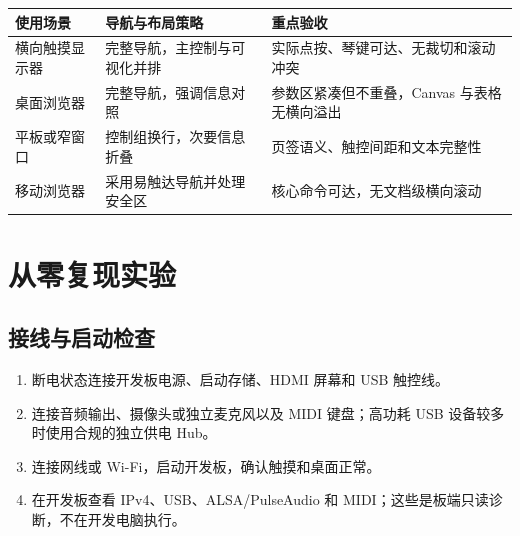 \begin{longtable}[]{@{}
  >{\raggedright\arraybackslash}p{}
  >{\raggedright\arraybackslash}p{}
  >{\raggedright\arraybackslash}p{}@{}}
\toprule\noalign{}
\begin{minipage}[b]{\linewidth}\raggedright
使用场景
\end{minipage} & \begin{minipage}[b]{\linewidth}\raggedright
导航与布局策略
\end{minipage} & \begin{minipage}[b]{\linewidth}\raggedright
重点验收
\end{minipage} \\
\midrule\noalign{}
\endhead
\bottomrule\noalign{}
\endlastfoot
横向触摸显示器 & 完整导航，主控制与可视化并排 &
实际点按、琴键可达、无裁切和滚动冲突 \\
桌面浏览器 & 完整导航，强调信息对照 & 参数区紧凑但不重叠，Canvas
与表格无横向溢出 \\
平板或窄窗口 & 控制组换行，次要信息折叠 &
页签语义、触控间距和文本完整性 \\
移动浏览器 & 采用易触达导航并处理安全区 &
核心命令可达，无文档级横向滚动 \\
\end{longtable}

\section{从零复现实验}\label{src-experiment-case3-reproduction}

\subsection{接线与启动检查}\label{src-experiment-case3-bringup}

\begin{enumerate}
\def\labelenumi{\arabic{enumi}.}
\tightlist
\item
  断电状态连接开发板电源、启动存储、HDMI 屏幕和 USB 触控线。
\item
  连接音频输出、摄像头或独立麦克风以及 MIDI 键盘；高功耗 USB
  设备较多时使用合规的独立供电 Hub。
\item
  连接网线或 Wi-Fi，启动开发板，确认触摸和桌面正常。
\item
  在开发板查看 IPv4、USB、ALSA/PulseAudio 和
  MIDI；这些是板端只读诊断，不在开发电脑执行。
\end{enumerate}

